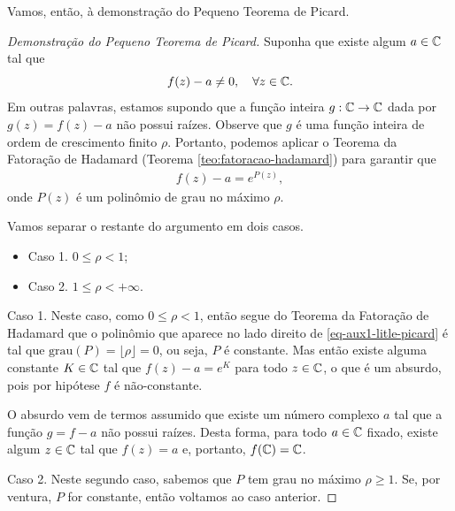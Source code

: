         \medskip
        Vamos, então, à demonstração do Pequeno Teorema de Picard.
        \begin{proof}[Demonstração do Pequeno Teorema de Picard]
            Suponha que existe algum $a\in\mathbb{C}$ tal que
            \[
            f(z) - a \neq 0, \quad \forall z\in\mathbb{C}.
            \]
            Em outras palavras, estamos supondo que a função inteira $g:\mathbb{C}\to\mathbb{C}$ 
            dada por $g(z)= f(z)-a$ não possui raízes. 
            Observe que $g$ é uma função inteira de ordem de crescimento 
            finito $\rho$. Portanto, podemos aplicar o Teorema da 
            Fatoração de Hadamard (Teorema \ref{teo:fatoracao-hadamard}) 
            para garantir que 
            \begin{align}
            \label{eq-aux1-litle-picard}
                f(z) - a = e^{P(z)},
            \end{align}
            onde $P(z)$ é um polinômio de grau no máximo $\rho$.
            
            \medskip 
            Vamos separar o restante do argumento em dois casos.
            \begin{itemize}
                \item Caso 1. $0\leqslant \rho<1$;
                \item Caso 2. $1\leq\rho<+\infty$.
            \end{itemize}
            \medskip 
            
            
            Caso 1. Neste caso, como $0\leqslant \rho<1$, então  
            segue do Teorema da Fatoração de Hadamard que
            o polinômio que aparece no lado direito de
            \eqref{eq-aux1-litle-picard} é tal que
            $\textrm{grau}(P)=\lfloor \rho \rfloor =0$, ou seja, 
            $P$ é constante. Mas então existe 
            alguma constante $K\in \mathbb{C}$ tal que 
            $f(z)-a=e^K$ para todo $z\in\mathbb{C}$, o que 
            é um absurdo, pois por hipótese 
            $f$ é não-constante. 
            
            O absurdo vem de termos assumido que existe um número complexo $a$ tal que a função $g=f-a$ não possui raízes. Desta forma, para todo $a\in\mathbb{C}$ fixado, existe algum $z\in \mathbb{C}$ 
            tal que $f(z)=a$ e, portanto, $f(\mathbb{C})=\mathbb{C}$.
            
            
            \bigskip
            Caso 2.
            Neste segundo caso, sabemos que $P$ tem grau no máximo
            $\rho \geq 1$. Se, por ventura, $P$ for constante,
            então voltamos ao caso anterior.
            

\end{proof}
